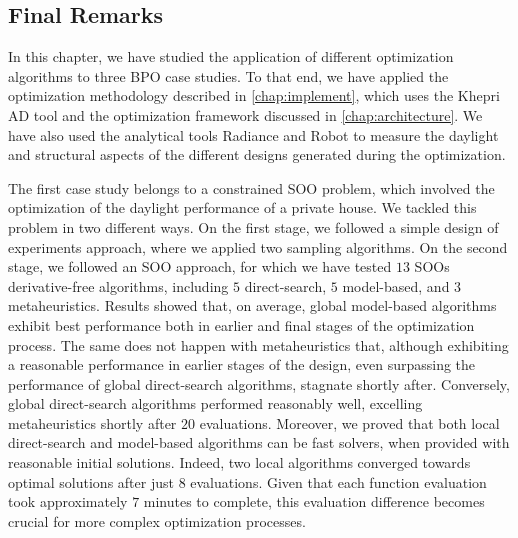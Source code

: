 \subsection{Final Remarks}

In this chapter, we have studied the application of different optimization algorithms to three \ac{BPO} case studies. To that end, we have applied the optimization methodology described in \cref{chap:implement}, which uses the Khepri \ac{AD} tool and the optimization framework discussed in \cref{chap:architecture}. We have also used the analytical tools Radiance and Robot to measure the daylight and structural aspects of the different designs generated during the optimization.

The first case study belongs to a constrained \ac{SOO} problem, which involved the optimization of the daylight performance of a private house. We tackled this problem in two different ways. On the first stage, we followed a simple design of experiments approach, where we applied two sampling algorithms. On the second stage, we followed an \ac{SOO} approach, for which we have tested $13$ \acp{SOO} derivative-free algorithms, including $5$ direct-search, $5$ model-based, and $3$ metaheuristics. Results showed that, on average, global model-based algorithms exhibit best performance both in earlier and final stages of the optimization process. The same does not happen with metaheuristics that, although exhibiting a reasonable performance in earlier stages of the design, even surpassing the performance of global direct-search algorithms, stagnate shortly after. Conversely, global direct-search algorithms performed reasonably well, excelling metaheuristics shortly after $20$ evaluations. Moreover, we proved that both local direct-search and model-based algorithms can be fast solvers, when provided with reasonable initial solutions. Indeed, two local algorithms converged towards optimal solutions after just $8$ evaluations. Given that each function evaluation took approximately $7$ minutes to complete, this evaluation difference becomes crucial for more complex optimization processes.

